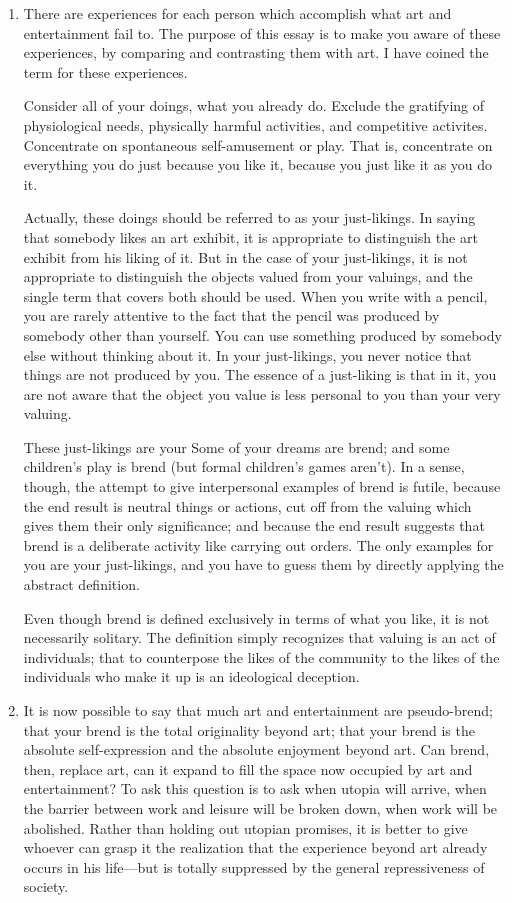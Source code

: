\begin{enumerate}[label=\textbf{\arabic*.}, wide, itemsep=1em]
\item There are experiences for each person which accomplish what art and entertainment fail to. The purpose of this essay is to make you aware of these experiences, by comparing and contrasting them with art. I have coined the term  for these experiences. 

Consider all of your doings, what you already do. Exclude the gratifying of physiological needs, physically harmful activities, and competitive activites. Concentrate on spontaneous self-amusement or play. That is, concentrate on everything you do just because you like it, because you just like it as you do it. 

Actually, these doings should be referred to as your just-likings. In saying that somebody likes an art exhibit, it is appropriate to distinguish the art exhibit from his liking of it. But in the case of your just-likings, it is not appropriate to distinguish the objects valued from your valuings, and the single term that covers both should be used. When you write with a pencil, you are rarely attentive to the fact that the pencil was produced by somebody other than yourself. You can use something produced by somebody else without thinking about it. In your just-likings, you never notice that things are not produced by you. The essence of a just-liking is that in it, you are not aware that the object you value is less personal to you than your very valuing. 

These just-likings are your  Some of your dreams are brend; and some children's play is brend (but formal children's games aren't). In a sense, though, the attempt to give interpersonal examples of brend is futile, because the end result is neutral things or actions, cut off from the valuing which gives them their only significance; and because the end result suggests that brend is a deliberate activity like carrying out orders. The only examples for you are your just-likings, and you have to guess them by directly applying the abstract definition. 

Even though brend is defined exclusively in terms of what you like, it is not necessarily solitary. The definition simply recognizes that valuing is an act of individuals; that to counterpose the likes of the community to the likes of the individuals who make it up is an ideological deception. 

\item It is now possible to say that much art and entertainment are pseudo-brend; that your brend is the total originality beyond art; that your brend is the absolute self-expression and the absolute enjoyment beyond art. Can brend, then, replace art, can it expand to fill the space now occupied by art and entertainment? To ask this question is to ask when utopia will arrive, when the barrier between work and leisure will be broken down, when work will be abolished. Rather than holding out utopian promises, it is better to give whoever can grasp it the realization that the experience beyond art already occurs in his life---but is totally suppressed by the general repressiveness of society. \end{enumerate}

